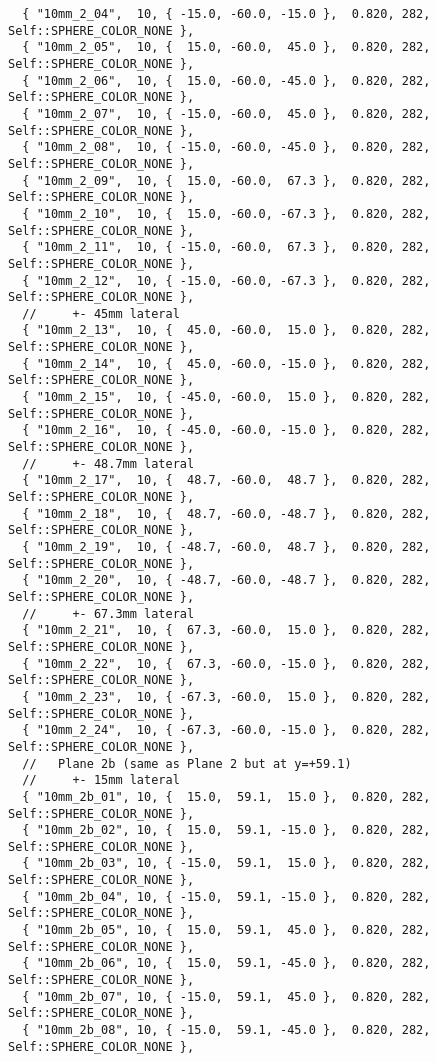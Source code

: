 \documentclass{InsightArticle}
\begin{document}
{\begin{verbatim}
  { "10mm_2_04",  10, { -15.0, -60.0, -15.0 },  0.820, 282, Self::SPHERE_COLOR_NONE },
  { "10mm_2_05",  10, {  15.0, -60.0,  45.0 },  0.820, 282, Self::SPHERE_COLOR_NONE },
  { "10mm_2_06",  10, {  15.0, -60.0, -45.0 },  0.820, 282, Self::SPHERE_COLOR_NONE },
  { "10mm_2_07",  10, { -15.0, -60.0,  45.0 },  0.820, 282, Self::SPHERE_COLOR_NONE },
  { "10mm_2_08",  10, { -15.0, -60.0, -45.0 },  0.820, 282, Self::SPHERE_COLOR_NONE },
  { "10mm_2_09",  10, {  15.0, -60.0,  67.3 },  0.820, 282, Self::SPHERE_COLOR_NONE },
  { "10mm_2_10",  10, {  15.0, -60.0, -67.3 },  0.820, 282, Self::SPHERE_COLOR_NONE },
  { "10mm_2_11",  10, { -15.0, -60.0,  67.3 },  0.820, 282, Self::SPHERE_COLOR_NONE },
  { "10mm_2_12",  10, { -15.0, -60.0, -67.3 },  0.820, 282, Self::SPHERE_COLOR_NONE },
  //     +- 45mm lateral
  { "10mm_2_13",  10, {  45.0, -60.0,  15.0 },  0.820, 282, Self::SPHERE_COLOR_NONE },
  { "10mm_2_14",  10, {  45.0, -60.0, -15.0 },  0.820, 282, Self::SPHERE_COLOR_NONE },
  { "10mm_2_15",  10, { -45.0, -60.0,  15.0 },  0.820, 282, Self::SPHERE_COLOR_NONE },
  { "10mm_2_16",  10, { -45.0, -60.0, -15.0 },  0.820, 282, Self::SPHERE_COLOR_NONE },
  //     +- 48.7mm lateral
  { "10mm_2_17",  10, {  48.7, -60.0,  48.7 },  0.820, 282, Self::SPHERE_COLOR_NONE },
  { "10mm_2_18",  10, {  48.7, -60.0, -48.7 },  0.820, 282, Self::SPHERE_COLOR_NONE },
  { "10mm_2_19",  10, { -48.7, -60.0,  48.7 },  0.820, 282, Self::SPHERE_COLOR_NONE },
  { "10mm_2_20",  10, { -48.7, -60.0, -48.7 },  0.820, 282, Self::SPHERE_COLOR_NONE },
  //     +- 67.3mm lateral
  { "10mm_2_21",  10, {  67.3, -60.0,  15.0 },  0.820, 282, Self::SPHERE_COLOR_NONE },
  { "10mm_2_22",  10, {  67.3, -60.0, -15.0 },  0.820, 282, Self::SPHERE_COLOR_NONE },
  { "10mm_2_23",  10, { -67.3, -60.0,  15.0 },  0.820, 282, Self::SPHERE_COLOR_NONE },
  { "10mm_2_24",  10, { -67.3, -60.0, -15.0 },  0.820, 282, Self::SPHERE_COLOR_NONE },
  //   Plane 2b (same as Plane 2 but at y=+59.1)
  //     +- 15mm lateral
  { "10mm_2b_01", 10, {  15.0,  59.1,  15.0 },  0.820, 282, Self::SPHERE_COLOR_NONE },
  { "10mm_2b_02", 10, {  15.0,  59.1, -15.0 },  0.820, 282, Self::SPHERE_COLOR_NONE },
  { "10mm_2b_03", 10, { -15.0,  59.1,  15.0 },  0.820, 282, Self::SPHERE_COLOR_NONE },
  { "10mm_2b_04", 10, { -15.0,  59.1, -15.0 },  0.820, 282, Self::SPHERE_COLOR_NONE },
  { "10mm_2b_05", 10, {  15.0,  59.1,  45.0 },  0.820, 282, Self::SPHERE_COLOR_NONE },
  { "10mm_2b_06", 10, {  15.0,  59.1, -45.0 },  0.820, 282, Self::SPHERE_COLOR_NONE },
  { "10mm_2b_07", 10, { -15.0,  59.1,  45.0 },  0.820, 282, Self::SPHERE_COLOR_NONE },
  { "10mm_2b_08", 10, { -15.0,  59.1, -45.0 },  0.820, 282, Self::SPHERE_COLOR_NONE },

\end{verbatim}}
\end{document}
